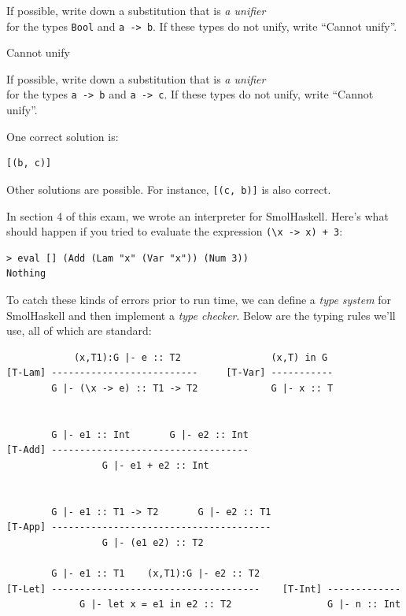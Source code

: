\documentclass[addpoints]{exam}
\begin{document}
\begin{questions}
\question[2] If possible, write down a substitution that is \emph{a unifier} \\ for the types \texttt{Bool} and \texttt{a -> b}.   If these types do not unify, write ``Cannot unify''.
\begin{solutionorbox}[1in]
Cannot unify
\end{solutionorbox}

\newpage

\question[2] If possible, write down a substitution that is \emph{a unifier} \\ for the types \texttt{a -> b} and \texttt{a -> c}.   If these types do not unify, write ``Cannot unify''.
\begin{solutionorbox}[1in]
One correct solution is:
\begin{verbatim}
[(b, c)]
\end{verbatim}
Other solutions are possible. For instance, \verb|[(c, b)]| is also correct.
\end{solutionorbox}

\question In section 4 of this exam, we wrote an interpreter for SmolHaskell.  Here's what should happen if you tried to evaluate the expression \verb|(\x -> x) + 3|:

\begin{verbatim}
> eval [] (Add (Lam "x" (Var "x")) (Num 3))
Nothing
\end{verbatim}

To catch these kinds of errors prior to run time, we can define a \emph{type system} for SmolHaskell and then implement a \emph{type checker}.  Below are the typing rules we'll use, all of which are standard:

{\small
\begin{verbatim}
            (x,T1):G |- e :: T2                (x,T) in G                
[T-Lam] --------------------------     [T-Var] -----------
        G |- (\x -> e) :: T1 -> T2             G |- x :: T


        G |- e1 :: Int       G |- e2 :: Int
[T-Add] -----------------------------------
                 G |- e1 + e2 :: Int


        G |- e1 :: T1 -> T2       G |- e2 :: T1  
[T-App] ---------------------------------------
                 G |- (e1 e2) :: T2
                             
        G |- e1 :: T1    (x,T1):G |- e2 :: T2
[T-Let] -------------------------------------    [T-Int] -------------
             G |- let x = e1 in e2 :: T2                 G |- n :: Int
\end{verbatim}
}


\end{questions}
\end{document}
